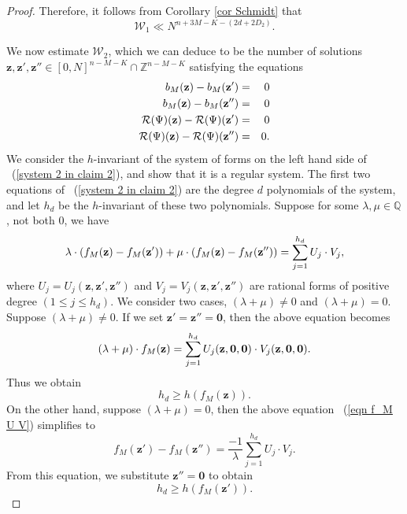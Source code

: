 \documentclass[12pt]{amsart}
\theoremstyle{definition}
\theoremstyle{remark}
\numberwithin{equation}{section}
\begin{document}
\begin{proof}
Therefore, it follows from Corollary \ref{cor Schmidt} that
$$
\mathcal{W}_1 \ll N^{n + 3M - K - (2 d + 2 D_2)}.
$$

We now estimate $\mathcal{W}_2$,
which we can deduce to be the number of solutions $\mathbf{z}, \mathbf{z}', \mathbf{z}'' \in [0,N]^{n-M-K } \cap \mathbb{Z}^{n-M-K}$
satisfying the equations
\begin{eqnarray}
\label{system 2 in claim 2}
{b}_M( \mathbf{z} ) - {b}_M( \mathbf{z}' ) &=& 0
\\
{b}_M( \mathbf{z} ) - {b}_M(  \mathbf{z}'' ) &=& 0
\notag
\\
{\mathcal{R}}(\Psi) ( \mathbf{z}) - {\mathcal{R}}(\Psi) (\mathbf{z}') &=& 0
\notag
\\
{\mathcal{R}}(\Psi) ( \mathbf{z}) - {\mathcal{R}}(\Psi) (\mathbf{z}'') &=& 0.
\notag
\end{eqnarray}
We consider the $h$-invariant of the system of forms on the left hand side of ~(\ref{system 2 in claim 2}), and show that
it is a regular system. The first two equations of ~(\ref{system 2 in claim 2})
are the degree $d$ polynomials of the system, and let $h_d$ be the $h$-invariant of these two polynomials.
Suppose for some $\lambda, \mu \in \mathbb{Q}$, not both $0$, we have
\begin{eqnarray}
\label{eqn f_M U V}
\lambda \cdot ( {f}_M ( \mathbf{z} ) - {f}_M (  \mathbf{z}' ) )
+ \mu \cdot ( {f}_M ( \mathbf{z} ) - {f}_M ( \mathbf{z}'' ) )
= \sum_{j=1}^{h_d} U_j \cdot V_j,
\notag
\end{eqnarray}
where $U_j = U_j( \mathbf{z}, \mathbf{z}', \mathbf{z}'' )$ and $V_j =
V_j( \mathbf{z}, \mathbf{z}', \mathbf{z}'' )$ are rational forms of positive degree $(1 \leq j \leq h_d)$.
We consider two cases, $(\lambda + \mu ) \not = 0$ and $(\lambda + \mu ) = 0$.
Suppose $(\lambda + \mu ) \not = 0$. If we set $\mathbf{z}' = \mathbf{z}'' = \mathbf{0}$, then the above equation becomes
\begin{eqnarray}
(\lambda + \mu ) \cdot  {f}_M( \mathbf{z} )
=  \sum_{j=1}^{h_d}  U_j (\mathbf{z}, \mathbf{0}, \mathbf{0} ) \cdot V_j (\mathbf{z}, \mathbf{0}, \mathbf{0} ).
\notag
\end{eqnarray}
Thus we obtain
$$
h_d \geq h( {f}_M( \mathbf{z} ) ).
$$
On the other hand, suppose $(\lambda + \mu ) = 0$, then the above equation ~(\ref{eqn f_M U V}) simplifies to
$$
{f}_M(  \mathbf{z}' ) - {f}_M(  \mathbf{z}'' )
= \frac{-1}{\lambda} \sum_{j=1}^{h_d} U_j \cdot V_j.
$$
From this equation, 
we substitute $\mathbf{z}'' = \mathbf{0}$ to obtain
$$
h_d \geq h( {f}_M(  \mathbf{z}' ) ).
$$
\end{proof}
\end{document}

